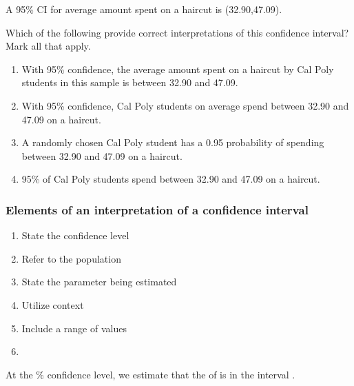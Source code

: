\begin{frame}
A 95\% CI for average amount spent on a haircut is (32.90,47.09).
\begin{clicker}{Which of the following provide correct interpretations of this confidence interval?  Mark all that apply.}
\begin{enumerate}
    \item
    With 95\% confidence, the average amount spent on a haircut by Cal Poly students in this sample is between 32.90 and 47.09.
    \item
    With 95\% confidence, Cal Poly students on average spend between 32.90 and 47.09 on a haircut.
    \item
    A randomly chosen Cal Poly student has a 0.95 probability of spending between 32.90 and 47.09 on a haircut.
    \item
    95\% of Cal Poly students spend between 32.90 and 47.09 on a haircut.
\end{enumerate}
\end{clicker}
\end{frame}

\begin{frame}
\frametitle{Elements of an interpretation of a confidence interval}
\begin{enumerate}
    \item
    State the confidence level
    \item
    Refer to the population
    \item
    State the parameter being estimated
    \item
    Utilize context
    \item
    Include a range of values
    \item[]
\end{enumerate}

At the  \% confidence level, we estimate that the   of  is in the interval .
\end{frame}

